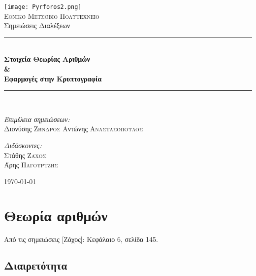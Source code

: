 \documentclass[11pt,a4paper]{book}
\newcommand{\HRule}{\rule{\linewidth}{0.5mm}}
\begin{document}
\begin{titlepage}
\begin{center}

\texttt{[image: Pyrforos2.png]}\\[1.cm]
\textsc{\LARGE Εθνικό Μετσόβιο Πολυτεχνείο}\\[1.5cm]

\Large{ Σημειώσεις Διαλέξεων }\\[0.5cm]

\begin{doublespace}
\HRule \\[0.4cm]
{\huge \bfseries
Στοιχεία Θεωρίας Αριθμών
\\
\&
\\
Εφαρμογές στην Κρυπτογραφία
}\\[0.4cm]
\end{doublespace}

\HRule \\[1.5cm]

\begin{minipage}{0.4\textwidth}
\begin{flushleft} \large
\emph{Επιμέλεια σημειώσεων:}\\
Διονύσης \textsc{Ζήνδρος}
Αντώνης \textsc{Αναστασόπουλος}
\end{flushleft}
\end{minipage}
\begin{minipage}{0.4\textwidth}
\begin{flushright} \large
\emph{Διδάσκοντες:} \\
Στάθης \textsc{Ζάχος}\\
Άρης \textsc{Παγουρτζής}
\end{flushright}
\end{minipage}

\vfill

{\large \today}
\end{center}
\end{titlepage}

\section*{Θεωρία αριθμών}

Από τις σημειώσεις [Ζάχος]: Κεφάλαιο 6, σελίδα 145.

\subsection*{Διαιρετότητα}
\end{document}
